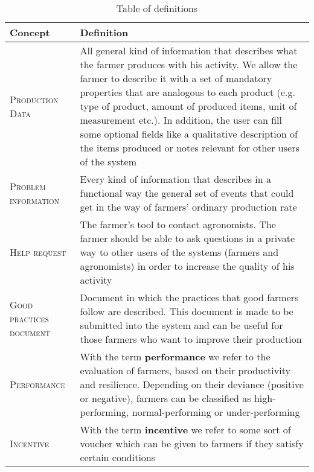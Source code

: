 \begin{table}[H]
    \setlength\arrayrulewidth{1pt}
    \centering
    \begin{tabular}{|m{}|m{}|}
        \rowcolor{myblue}
        \hline
        \color{white}Concept & \color{white}Definition \\
        \hline
        \textsc{Production Data}     &   All general kind of information that describes what the farmer produces with his activity. We allow the farmer to describe it with a set of mandatory properties that are analogous to each product (e.g. type of product, amount of produced items, unit of measurement etc.). In addition, the user can fill some optional fields like a qualitative description of the items produced or notes relevant for other users of the system \\
        \hline
        \textsc{Problem information}  &   Every kind of information that describes in a functional way the general set of events that could get in the way of farmers' ordinary production rate \\
        \hline
        \textsc{Help request}     &   The farmer's tool to contact agronomists. The farmer should be able to ask questions in a private way to other users of the systems (farmers and agronomists) in order to increase the quality of his activity \\
        \hline
        \textsc{\nohyphens{Good  practices document}}     &   Document in which the practices that good farmers follow are described. This document is made to be submitted into the system and can be useful for those farmers who want to improve their production \\
        \hline
        \textsc{Performance}     &   With the term \textbf{performance} we refer to the evaluation of farmers, based on their productivity and resilience. Depending on their deviance (positive or negative), farmers can be classified as high-performing, normal-performing or under-performing \\
        \hline
        \textsc{Incentive}  &   With the term \textbf{incentive} we refer to some sort of voucher which can be given to farmers if they satisfy certain conditions \\
        \hline
    \end{tabular}
    
    \caption{\label{tab:def_table}Table of definitions}
    
\end{table}

